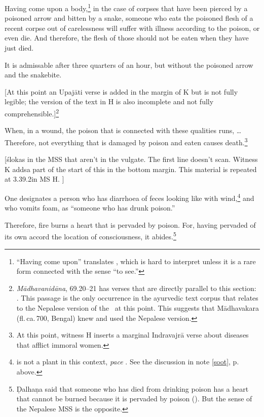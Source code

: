 \begin{translation}[resume]
\dag Having come upon a body,\footnote{“Having come upon” translates
    , which is hard to interpret unless it is a rare form
    connected with the sense “to see.”} in the case of corpses that have
    been pierced by a poisoned arrow and bitten by a snake, someone who
    eats the poisoned flesh of a recent corpse out of carelessness will
    suffer with illness according to the poison, or even die. And
    therefore, the flesh of those should not be eaten when they have just
    died.
  
It is admissable after three quarters of an hour, but without the
poisoned arrow and the snakebite.
  
\item[35.1]

[At this point an Upajāti verse is added in the margin of K but is not
fully legible; the version of the text in H is also incomplete and not
fully comprehensible.]\footnote{\emph{Mādhavanidāna}, 69.20--21
    \citep[480]{madhava1} has verses that are directly parallel to this
    section: .
    This passage is the only occurrence in the ayurvedic text corpus that
    relates to the Nepalese version of the \SS\ at this point. This
    suggests that Mādhavakara (fl.\,ca.\,700, Bengal) knew and used the
    Nepalese version.}
  

  \item[35.3]

\dag When, in a wound, the poison that is connected with these
qualities runs, \ldots Therefore, not everything that is damaged by
poison and eaten causes death.\footnote{At this point, witness H
    inserts a marginal Indravajrā verse about diseases that afflict
    immoral women.}
  
\item[35.1] 

  [ślokas in the MSS that aren't in the vulgate. The first line
doesn't scan. Witness K addsa part of the start of this in the
bottom margin. This material is repeated at 3.39.2in MS H. ]
  

  \item
  [35cd \& 36cd] 
  
One designates a person who has diarrhoea of feces looking like
 with wind,\footnote{ is not a plant
    in this context, \emph{pace} \cite[362]{moni-sans}. See the discussion
    in note \ref{soot}, p.\,\pageref{soot} above.\label{grhadhuma}} and who
    vomits foam, as “someone who has drunk poison.” \item[37]  Therefore,
    fire burns a  heart that is  pervaded by poison. For, having pervaded
    of its own accord  the location of consciousness, it
    abides.\footnote{Ḍalhaṇa said that someone who has died from drinking
        poison has a heart that cannot be burned because it is pervaded by
        poison (). But the sense of the Nepalese MSS is the
        opposite.}
 

\end{translation}

